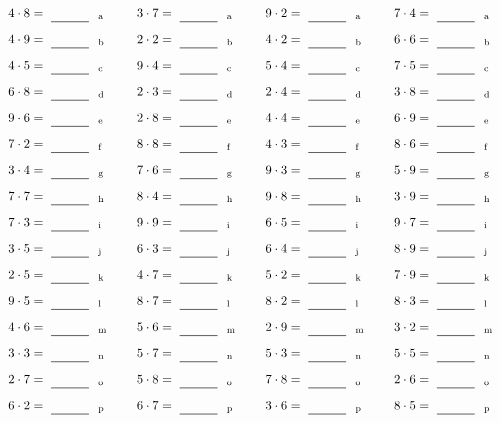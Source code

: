 \documentclass
[
  draft    = true,
  fontsize = 11pt,
  parskip  = half-
]
{scrartcl}
\begin{document}
\par\vfill\par
\begin{align*}
    \pline{4\cdot8}&=\rline{a}
  & \pline{3\cdot7}&=\rline{a}
  & \pline{9\cdot2}&=\rline{a}
  & \pline{7\cdot4}&=\rline{a} \\[1ex]
    \pline{4\cdot9}&=\rline{b}
  & \pline{2\cdot2}&=\rline{b}
  & \pline{4\cdot2}&=\rline{b}
  & \pline{6\cdot6}&=\rline{b} \\[1ex]
    \pline{4\cdot5}&=\rline{c}
  & \pline{9\cdot4}&=\rline{c}
  & \pline{5\cdot4}&=\rline{c}
  & \pline{7\cdot5}&=\rline{c} \\[1ex]
    \pline{6\cdot8}&=\rline{d}
  & \pline{2\cdot3}&=\rline{d}
  & \pline{2\cdot4}&=\rline{d}
  & \pline{3\cdot8}&=\rline{d} \\[1ex]
    \pline{9\cdot6}&=\rline{e}
  & \pline{2\cdot8}&=\rline{e}
  & \pline{4\cdot4}&=\rline{e}
  & \pline{6\cdot9}&=\rline{e} \\[1ex]
    \pline{7\cdot2}&=\rline{f}
  & \pline{8\cdot8}&=\rline{f}
  & \pline{4\cdot3}&=\rline{f}
  & \pline{8\cdot6}&=\rline{f} \\[1ex]
    \pline{3\cdot4}&=\rline{g}
  & \pline{7\cdot6}&=\rline{g}
  & \pline{9\cdot3}&=\rline{g}
  & \pline{5\cdot9}&=\rline{g} \\[1ex]
    \pline{7\cdot7}&=\rline{h}
  & \pline{8\cdot4}&=\rline{h}
  & \pline{9\cdot8}&=\rline{h}
  & \pline{3\cdot9}&=\rline{h} \\[1ex]
    \pline{7\cdot3}&=\rline{i}
  & \pline{9\cdot9}&=\rline{i}
  & \pline{6\cdot5}&=\rline{i}
  & \pline{9\cdot7}&=\rline{i} \\[1ex]
    \pline{3\cdot5}&=\rline{j}
  & \pline{6\cdot3}&=\rline{j}
  & \pline{6\cdot4}&=\rline{j}
  & \pline{8\cdot9}&=\rline{j} \\[1ex]
    \pline{2\cdot5}&=\rline{k}
  & \pline{4\cdot7}&=\rline{k}
  & \pline{5\cdot2}&=\rline{k}
  & \pline{7\cdot9}&=\rline{k} \\[1ex]
    \pline{9\cdot5}&=\rline{l}
  & \pline{8\cdot7}&=\rline{l}
  & \pline{8\cdot2}&=\rline{l}
  & \pline{8\cdot3}&=\rline{l} \\[1ex]
    \pline{4\cdot6}&=\rline{m}
  & \pline{5\cdot6}&=\rline{m}
  & \pline{2\cdot9}&=\rline{m}
  & \pline{3\cdot2}&=\rline{m} \\[1ex]
    \pline{3\cdot3}&=\rline{n}
  & \pline{5\cdot7}&=\rline{n}
  & \pline{5\cdot3}&=\rline{n}
  & \pline{5\cdot5}&=\rline{n} \\[1ex]
    \pline{2\cdot7}&=\rline{o}
  & \pline{5\cdot8}&=\rline{o}
  & \pline{7\cdot8}&=\rline{o}
  & \pline{2\cdot6}&=\rline{o} \\[1ex]
    \pline{6\cdot2}&=\rline{p}
  & \pline{6\cdot7}&=\rline{p}
  & \pline{3\cdot6}&=\rline{p}
  & \pline{8\cdot5}&=\rline{p}
\end{align*}
\end{document}
